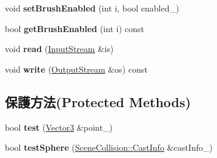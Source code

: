 \begin{DoxyCompactItemize}
\item 
void {\bfseries set\+Brush\+Enabled} (int i, bool enabled\+\_\+)\hypertarget{class_i_dream_sky_1_1_scene_collision_1_1_data_a6ef0c14804149b19a1e62018341eeaca}{}\label{class_i_dream_sky_1_1_scene_collision_1_1_data_a6ef0c14804149b19a1e62018341eeaca}

\item 
bool {\bfseries get\+Brush\+Enabled} (int i) const \hypertarget{class_i_dream_sky_1_1_scene_collision_1_1_data_a922978a1494fc270511c23018215d17c}{}\label{class_i_dream_sky_1_1_scene_collision_1_1_data_a922978a1494fc270511c23018215d17c}

\item 
void {\bfseries read} (\hyperlink{class_i_dream_sky_1_1_input_stream}{Input\+Stream} \&is)\hypertarget{class_i_dream_sky_1_1_scene_collision_1_1_data_a801ff29438c640b9592aa8a3e2ee0db4}{}\label{class_i_dream_sky_1_1_scene_collision_1_1_data_a801ff29438c640b9592aa8a3e2ee0db4}

\item 
void {\bfseries write} (\hyperlink{class_i_dream_sky_1_1_output_stream}{Output\+Stream} \&os) const \hypertarget{class_i_dream_sky_1_1_scene_collision_1_1_data_a2542a11b2b0a17f96415436f00af21b7}{}\label{class_i_dream_sky_1_1_scene_collision_1_1_data_a2542a11b2b0a17f96415436f00af21b7}

\end{DoxyCompactItemize}
\subsection*{保護方法(Protected Methods)}
\begin{DoxyCompactItemize}
\item 
bool {\bfseries test} (\hyperlink{class_i_dream_sky_1_1_vector3}{Vector3} \&point\+\_\+)\hypertarget{class_i_dream_sky_1_1_scene_collision_1_1_data_a6bdb978f344cf16bf1b8f670a1907cb7}{}\label{class_i_dream_sky_1_1_scene_collision_1_1_data_a6bdb978f344cf16bf1b8f670a1907cb7}

\item 
bool {\bfseries test\+Sphere} (\hyperlink{class_i_dream_sky_1_1_scene_collision_1_1_cast_info}{Scene\+Collision\+::\+Cast\+Info} \&cast\+Info\+\_\+)\hypertarget{class_i_dream_sky_1_1_scene_collision_1_1_data_a1325c4722caf46a879f333c52032e4d9}{}\label{class_i_dream_sky_1_1_scene_collision_1_1_data_a1325c4722caf46a879f333c52032e4d9}

\end{DoxyCompactItemize}
